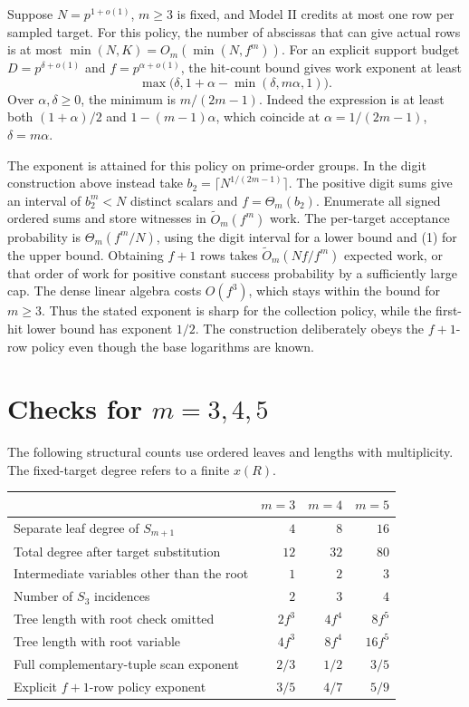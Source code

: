 \documentclass[11pt]{article}
\begin{document}
Suppose \(N=p^{1+o(1)}\), \(m\ge3\) is fixed, and Model II credits at most one row per sampled target. For this policy, the number of abscissas that can give actual rows is at most \(\min(N,K)=O_m(\min(N,f^m))\). For an explicit support budget \(D=p^{\delta+o(1)}\) and \(f=p^{\alpha+o(1)}\), the hit-count bound gives work exponent at least
\[
 \max\bigl(\delta,1+\alpha-\min(\delta,m\alpha,1)\bigr).
\]
Over \(\alpha,\delta\ge0\), the minimum is \(m/(2m-1)\). Indeed the expression is at least both \((1+\alpha)/2\) and \(1-(m-1)\alpha\), which coincide at \(\alpha=1/(2m-1)\), \(\delta=m\alpha\).

The exponent is attained for this policy on prime-order groups. In the digit construction above instead take \(b_2=\lceil N^{1/(2m-1)}\rceil\). The positive digit sums give an interval of \(b_2^m<N\) distinct scalars and \(f=\Theta_m(b_2)\). Enumerate all signed ordered sums and store witnesses in \(\widetilde O_m(f^m)\) work. The per-target acceptance probability is \(\Theta_m(f^m/N)\), using the digit interval for a lower bound and (1) for the upper bound. Obtaining \(f+1\) rows takes \(\widetilde O_m(Nf/f^m)\) expected work, or that order of work for positive constant success probability by a sufficiently large cap. The dense linear algebra costs \(O(f^3)\), which stays within the bound for \(m\ge3\). Thus the stated exponent is sharp for the collection policy, while the first-hit lower bound has exponent \(1/2\). The construction deliberately obeys the \(f+1\)-row policy even though the base logarithms are known.

\section{Checks for \texorpdfstring{\(m=3,4,5\)}{m=3,4,5}}

The following structural counts use ordered leaves and lengths with multiplicity. The fixed-target degree refers to a finite \(x(R)\).
\begin{center}
\begin{tabular}{@{}lrrr@{}}
\toprule
& \(m=3\) & \(m=4\) & \(m=5\)\\
\midrule
Separate leaf degree of \(S_{m+1}\) & \(4\) & \(8\) & \(16\)\\
Total degree after target substitution & \(12\) & \(32\) & \(80\)\\
Intermediate variables other than the root & \(1\) & \(2\) & \(3\)\\
Number of \(S_3\) incidences & \(2\) & \(3\) & \(4\)\\
Tree length with root check omitted & \(2f^3\) & \(4f^4\) & \(8f^5\)\\
Tree length with root variable & \(4f^3\) & \(8f^4\) & \(16f^5\)\\
Full complementary-tuple scan exponent & \(2/3\) & \(1/2\) & \(3/5\)\\
Explicit \(f+1\)-row policy exponent & \(3/5\) & \(4/7\) & \(5/9\)\\
\bottomrule
\end{tabular}
\end{center}
\end{document}
